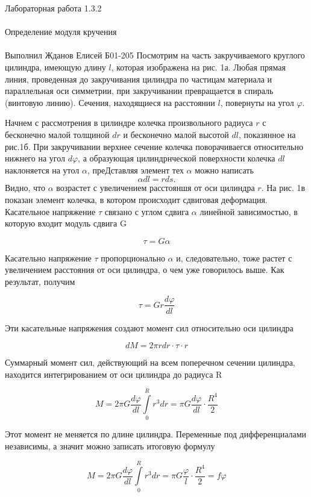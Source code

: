 \documentclass{astroedu-lab}
\begin{document}
\begin{problem}{\huge Лабораторная работа 1.3.2\\\\Определение модуля кручения\\\\Выполнил Жданов Елисей Б01-205}
Посмотрим на часть закручиваемого круглого цилиндра, имеющую длину $l$, которая изображена на рис. 1а. Любая прямая линия, проведенная до закручивания цилиндра по частицам материала и параллельная оси симметрии, при закручивании превращается в спираль (винтовую линию). Сечения, находящиеся на расстоянии $l$, повернуты на угол $\varphi$.

Начнем с рассмотрения в цилиндре колечка произвольного радиуса $r$ с бесконечно малой толщиной $d r$ и бесконечно малой высотой $d l$, показянное на рис.1б. При закручивании верхнее сечение колечка поворачиваегся относительно нижнего на угол $d \varphi$, а образующая цилиндрнческой поверхности колечка $d l$ наклоняется на утол $\alpha$, преДставляя элемент тех $\alpha$ можно написать
$$
\alpha d l=r d s .
$$
Видно, что $\alpha$ возрастет с увеличением расстояншя от оси цилиндра $r$. На рис. 1в показан элемент колечка, в котором происходит сдвиговая деформация. Касательное напряжение $\tau$ связано с углом сдвига $\alpha$ линейной зависимостью, в которую входит модуль сдвига G

\begin{equation}
	\tau = G \alpha
\end{equation}

Касательно напряжение $\tau$ пропорционально $\alpha$ и, следовательно, тоже растет с увеличением расстояния от оси цилиндра, о чем уже говорилось выше. Как результат, получим

\begin{equation}
	\tau = G r \frac{d \varphi}{d l}
\end{equation}

Эти касательные напряжения создают момент сил относительно оси цилиндра

\begin{equation}
	d M = 2 \pi r d r \cdot \tau \cdot r
\end{equation}

Суммарный момент сил, действующий на всем поперечном сечении цилиндра, находится интегрированием от оси цилиндра до радиуса R

\begin{equation}
	M = 2 \pi G \frac{d \varphi}{d l} \int\limits_0^R r^3 d r = \pi G \frac{d \varphi}{d l} \cdot \frac{R^4}{2}
\end{equation}

Этот момент не меняется по длине цилиндра. Переменные под дифференциалами независимы, а значит можно записать итоговую формулу

\begin{equation}
	M = 2 \pi G \frac{d \varphi}{d l} \int\limits_0^R r^3 d r = \pi G \frac{\varphi}{l} \cdot \frac{R^4}{2} = f \varphi
\end{equation}


\end{problem}
\end{document}
